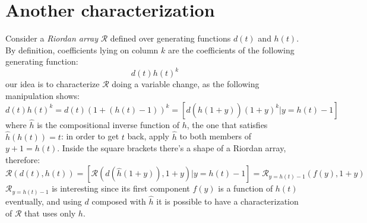 \documentclass[11pt,a4paper]{article} %
\begin{document}
    \title{\rmfamily\normalfont{}}
    \author{ \\ }
    \date{\today} 
    
    \maketitle
    
    \begin{abstract}
        This short document is a collection of some \emph{Riordan arrays}, coloured 
        according different partition schemes.
    \end{abstract}
       
    \tableofcontents

    \newpage

    \section{Another characterization}
    Consider a \emph{Riordan array} $\mathcal{R}$ defined over generating
    functions $d(t)$ and $h(t)$. By definition, coefficients lying on 
    column $k$ are the coefficients of the following generating function:
    \begin{displaymath}
        d(t)h(t)^k
    \end{displaymath}
    our idea is to characterize $\mathcal{R}$ doing a variable change, as the
    following manipulation shows:
    \begin{displaymath}
        d(t)h(t)^k = d(t)(1 + (h(t)-1))^k = \left[ d(\hat{h}(1+y))(1+y)^k \left| y = h(t)-1 \right. \right]
    \end{displaymath}
    where $\hat{h}$ is the compositional inverse function of $h$, the one that
    satisfies $\hat{h}(h(t)) = t$: in order to get $t$ back, apply $\hat{h}$ to
    both members of $y+1 = h(t)$.
    Inside the square brackets there's a shape of a Riordan array, therefore:
    \begin{displaymath}
        \mathcal{R}\left(d(t),h(t)\right) = \left[ \mathcal{R}\left(d(\hat{h}(1+y)), 1+y\right) \left| y = h(t)-1 \right. \right]
        = \mathcal{R}_{y=h(t)-1}\left( f(y), 1+y \right)
    \end{displaymath}
    $\mathcal{R}_{y=h(t)-1}$ is interesting since its first component $f(y)$ is a function of $h(t)$ eventually, 
    and using $d$ composed with $\hat{h}$ it is possible to have a characterization of $\mathcal{R}$
    that uses only $h$.
\end{document}
